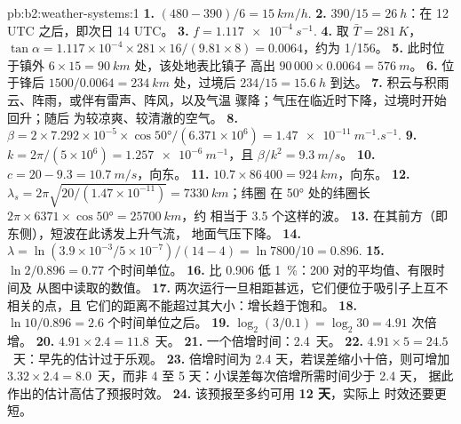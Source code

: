 \begin{solution}{pb:b2:weather-systems:1}
\textbf{1.} $(480 - 390)/6 = \qty{15}{km/h}$.
\textbf{2.} $390/15 = \qty{26}{h}$：在 12 UTC 之后，即次日 14 UTC。
\textbf{3.} $f = \qty{1.117e-4}{s^{-1}}$.
\textbf{4.} 取 $\bar T = \qty{281}{K}$，$\tan\alpha = 1.117 \times 10^{-4} \times 281 \times
16/(9.81 \times 8) = 0.0064$，约为 1/156。
\textbf{5.} 此时位于镇外 $6 \times 15 = \qty{90}{km}$ 处，该处地表比镇子
高出 $90\,000 \times 0.0064 = \qty{576}{m}$。
\textbf{6.} 位于锋后 $1500/0.0064 = \qty{234}{km}$ 处，过境后
$234/15 = \qty{15.6}{h}$ 到达。
\textbf{7.} 积云与积雨云、阵雨，或伴有雷声、阵风，以及气温
骤降；气压在临近时下降，过境时开始回升；随后
为较凉爽、较清澈的空气。
\textbf{8.} $\beta = 2 \times 7.292 \times 10^{-5} \times \cos\ang{50}/(6.371 \times 10^6) =
\qty{1.47e-11}{m^{-1}.s^{-1}}$.
\textbf{9.} $k = 2\pi/(5 \times 10^6) = \qty{1.257e-6}{m^{-1}}$，且 $\beta/k^2 = \qty{9.3}{m/s}$。
\textbf{10.} $c = 20 - 9.3 = \qty{10.7}{m/s}$，向东。
\textbf{11.} $10.7 \times 86\,400 = \qty{924}{km}$，向东。
\textbf{12.} $\lambda_s = 2\pi\sqrt{20/(1.47 \times 10^{-11})} = \qty{7330}{km}$；纬圈
在 \ang{50} 处的纬圈长 $2\pi \times 6371 \times \cos\ang{50} = \qty{25700}{km}$，约
相当于 3.5 个这样的波。
\textbf{13.} 在其前方（即东侧），短波在此诱发上升气流，
地面气压下降。
\textbf{14.} $\lambda = \ln(3.9 \times 10^{-3}/5 \times 10^{-7})/(14 - 4) = \ln 7800/10 = 0.896$.
\textbf{15.} $\ln 2/0.896 = 0.77$ 个时间单位。
\textbf{16.} 比 0.906 低 \qty{1}{\percent}：200 对的平均值、有限时间及
从图中读取的数值。
\textbf{17.} 两次运行一旦相距甚远，它们便位于吸引子上互不相关的点，且
它们的距离不能超过其大小：增长趋于饱和。
\textbf{18.} $\ln 10/0.896 = 2.6$ 个时间单位之后。
\textbf{19.} $\log_2(3/0.1) = \log_2 30 = 4.91$ 次倍增。
\textbf{20.} $4.91 \times 2.4 = 11.8$~天。
\textbf{21.} 一个倍增时间：2.4~天。
\textbf{22.} $4.91 \times 5 = 24.5$~天：早先的估计过于乐观。
\textbf{23.} 倍增时间为 2.4 天，若误差缩小十倍，则可增加 $3.32 \times 2.4
= 8.0$~天，而非 4 至 5 天：小误差每次倍增所需时间少于 2.4 天，
据此作出的估计高估了预报时效。
\textbf{24.} 该预报至多约可用 \textbf{12 天}，实际上
时效还要更短。
\end{solution}
